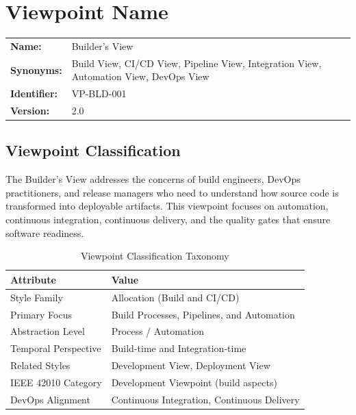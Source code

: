 \documentclass[11pt,letterpaper]{article}
\begin{document}
\tableofcontents
\newpage

\section{Viewpoint Name}

\begin{definitionbox}
\begin{tabular}{@{}L{3.5cm}L{10cm}@{}}
\textbf{Name:} & Builder's View \\[0.5em]
\textbf{Synonyms:} & Build View, CI/CD View, Pipeline View, Integration View, Automation View, DevOps View \\[0.5em]
\textbf{Identifier:} & VP-BLD-001 \\[0.5em]
\textbf{Version:} & 2.0 \\
\end{tabular}
\end{definitionbox}

\subsection{Viewpoint Classification}

The Builder's View addresses the concerns of build engineers, DevOps practitioners, and release managers who need to understand how source code is transformed into deployable artifacts. This viewpoint focuses on automation, continuous integration, continuous delivery, and the quality gates that ensure software readiness.

\begin{table}[H]
\centering
\caption{Viewpoint Classification Taxonomy}
\begin{tabular}{@{}L{4cm}L{10cm}@{}}
\toprule
\textbf{Attribute} & \textbf{Value} \\
\midrule
Style Family & Allocation (Build and CI/CD) \\
Primary Focus & Build Processes, Pipelines, and Automation \\
Abstraction Level & Process / Automation \\
Temporal Perspective & Build-time and Integration-time \\
Related Styles & Development View, Deployment View \\
IEEE 42010 Category & Development Viewpoint (build aspects) \\
DevOps Alignment & Continuous Integration, Continuous Delivery \\
\bottomrule
\end{tabular}
\end{table}
\end{document}
